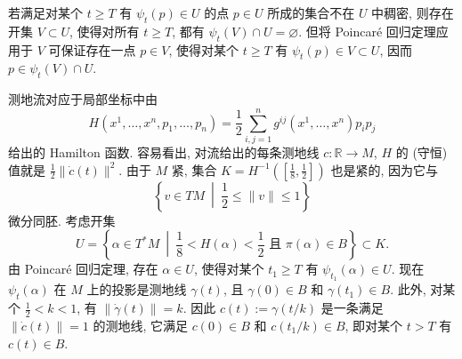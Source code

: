 \begin{description}[font=\normalfont,leftmargin=2em,labelwidth=1.5em]
若满足对某个 $t\ge T$ 有 $\psi_t(p)\in U$ 的点 $p\in U$ 所成的集合不在 $U$ 中稠密, 则存在开集 $V\subset U$, 使得对所有 $t\ge T$, 都有 $\psi_t(V)\cap U=\varnothing$. 但将 Poincaré 回归定理应用于 $V$ 可保证存在一点 $p\in V$, 使得对某个 $t\ge T$ 有 $\psi_t(p)\in V\subset U$, 因而 $p\in\psi_t(V)\cap U$.

测地流对应于局部坐标中由
\[
  H(x^1,\ldots,x^n,p_1,\ldots,p_n)=\frac12\sum_{i,j=1}^n g^{ij}(x^1,\ldots,x^n)p_ip_j
\]
给出的 Hamilton 函数. 容易看出, 对流给出的每条测地线 $c:\mathbb{R}\to M$, $H$ 的 (守恒) 值就是 $\frac12\lVert\dot c(t)\rVert^2$. 由于 $M$ 紧, 集合 $K=H^{-1}([\frac18,\frac12])$ 也是紧的, 因为它与
\[
  \left\{v\in TM\ \middle|\ \frac12\le\lVert v\rVert\le1\right\}
\]
微分同胚. 考虑开集
\[
  U=\left\{\alpha\in T^*M\ \middle|\ \frac18<H(\alpha)<\frac12
                                     \text{ 且 }\pi(\alpha)\in B\right\}\subset K.
\]
由 Poincaré 回归定理, 存在 $\alpha\in U$, 使得对某个 $t_1\ge T$ 有 $\psi_{t_1}(\alpha)\in U$. 现在 $\psi_t(\alpha)$ 在 $M$ 上的投影是测地线 $\gamma(t)$, 且 $\gamma(0)\in B$ 和 $\gamma(t_1)\in B$. 此外, 对某个 $\frac12<k<1$, 有 $\lVert\dot\gamma(t)\rVert=k$. 因此 $c(t):=\gamma(t/k)$ 是一条满足 $\lVert\dot c(t)\rVert=1$ 的测地线, 它满足 $c(0)\in B$ 和 $c(t_1/k)\in B$, 即对某个 $t>T$ 有 $c(t)\in B$.
\end{description}
